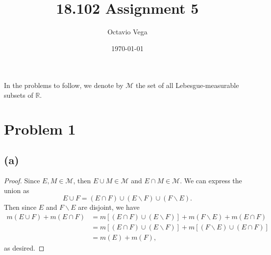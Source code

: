 \documentclass{article}
\title{18.102 Assignment 5}
\author{Octavio Vega}
\date\today
\newcommand{\R}{\mathbb{R}} %
\newcommand{\M}{\mathcal{M}} %
\begin{document}
\maketitle

In the problems to follow, we denote by $\M$ the set of all Lebesgue-measurable subsets of $\R$.

\section*{Problem 1}
\subsection*{(a)}
\begin{proof}
	Since $E, M \in \M$, then $E \cup M \in \M$ and $E \cap M \in \M$. We can express the union as 
	\begin{equation}
		E \cup F = (E \cap F) \cup (E \backslash F) \cup (F \backslash E).
	\end{equation}
	Then since $E$ and $F \backslash E$ are disjoint, we have
	\begin{align}
		m(E \cup F) + m(E \cap F) &= m\left[(E \cap F) \cup (E \backslash F)\right] + m(F \backslash E) + m(E \cap F) \\
		&= m\left[(E \cap F) \cup (E \backslash F)\right] + m\left[(F \backslash E) \cup (E \cap F)\right] \\
		&= m(E) + m(F),
	\end{align}
	as desired.	
\end{proof}
\end{document}
